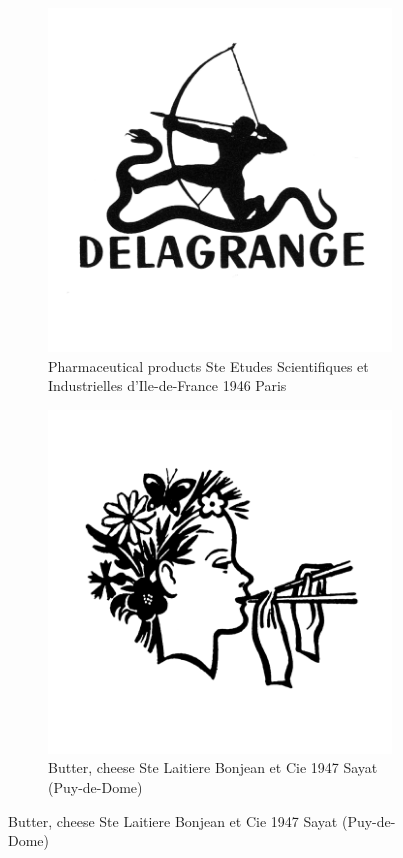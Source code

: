 \begin{figure}[h]
  \begin{subfigure}{.45\textwidth}
    \centering
    \includegraphics[width=.5\linewidth]{images/supplement/trademarks/french/2_10}
    \caption{Pharmaceutical products Ste Etudes Scientifiques et Industrielles d'Ile-de-France 1946 Paris}
    \label{fig:trademarks:french:2.10}
  \end{subfigure}\hfill
  \begin{subfigure}{.45\textwidth}
    \centering
    \includegraphics[width=.5\linewidth]{images/supplement/trademarks/french/2_11}
    \caption{Butter, cheese Ste Laitiere Bonjean et Cie 1947 Sayat (Puy-de-Dome)}
    \label{fig:trademarks:french:2.11}
  \end{subfigure}
\end{figure}

\clearpage

